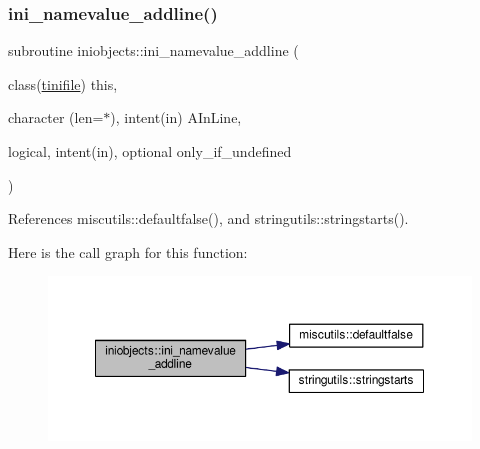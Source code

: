 \mbox{\label{namespaceiniobjects_a7b4567ba50cfd79f25f01c2a2b311e6b}} 
\subsubsection{\texorpdfstring{ini\+\_\+namevalue\+\_\+addline()}{ini\_namevalue\_addline()}}
{\footnotesize\ttfamily subroutine iniobjects\+::ini\+\_\+namevalue\+\_\+addline (\begin{DoxyParamCaption}\item[{class(\mbox{\hyperlink{structiniobjects_1_1tinifile}{tinifile}})}]{this,  }\item[{character (len=$\ast$), intent(in)}]{A\+In\+Line,  }\item[{logical, intent(in), optional}]{only\+\_\+if\+\_\+undefined }\end{DoxyParamCaption})\hspace{0.3cm}{\ttfamily [private]}}



References miscutils\+::defaultfalse(), and stringutils\+::stringstarts().

Here is the call graph for this function\+:
\nopagebreak
\begin{figure}[H]
\begin{center}
\leavevmode
\includegraphics[width=350pt]{namespaceiniobjects_a7b4567ba50cfd79f25f01c2a2b311e6b_cgraph}
\end{center}
\end{figure}
\mbox{\label{namespaceiniobjects_a74dae844438b97709e8a7fb1c44d87e9}} 
